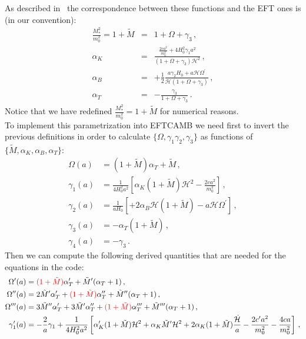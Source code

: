 \documentclass[prd,nofootinbib,showpacs]{revtex4}
\def\l{\left}
\def\r{\right}
\def\f{\frac}
\def\nn{\nonumber}
\def\hub{{\mathcal H}}
\begin{document}
{As described in~\cite{Bellini:2014fua}  the correspondence between these functions and the EFT ones is (in our convention):
 \begin{eqnarray}
\f{M_*^2}{m_0^2}=1+ \tilde{M}&=& 1+\Omega+ \gamma_3 \, , \nn \\
\alpha_K&= & \f{\f{2ca^2}{m_0^2}+4H_0^2\gamma_1a^2}{(1+\Omega+ \gamma_3)\hub^2} \, ,\nn \\
\alpha_B&=&  +\f{1}{2}\f{a\gamma_2H_0+a\hub\Omega^\prime}{\hub(1+\Omega+ \gamma_3) } \,, \nn \\
\alpha_T&=& -\f{\gamma_3}{1+\Omega+ \gamma_3} \,.
\end{eqnarray}
Notice that we have redefined $\f{M_*^2}{m_0^2}=1+ \tilde{M}$ for numerical reasons. \\
To implement this parametrization into EFTCAMB we need first to invert the previous definitions in order to calculate $\{\Omega, \gamma_1\gamma_2,\gamma_3\}$ as functions of $\{\tilde{M},\alpha_K,\alpha_B,\alpha_T\}$:
\begin{align}
\Omega(a) &= (1+ \tilde{M})\alpha_T+ \tilde{M}\,, \nonumber \\
\gamma_1(a) &= \f{1}{4H_0^2a^2}\l[\alpha_K(1+ \tilde{M})\hub^2-\f{2ca^2}{m_0^2}\r]\,,  \nonumber \\
\gamma_2(a) &=  \f{1}{aH_0}\l[+2\alpha_B\hub (1+ \tilde{M})-a\hub\Omega^\prime\r] \,,  \nonumber \\
\gamma_3(a) &= -\alpha_T(1+ \tilde{M}) \,,  \nonumber \\
\gamma_4(a) &= -\gamma_3\,.
\end{align}
%
Then we can compute the following derived quantities that are needed for the equations in the code:
\begin{align}
\Omega'(a) &=  \textcolor{red}{(1+\tilde{M})}\alpha_T^\prime+ \tilde{M}^\prime(\alpha_T+1)\,,  \nonumber \\ 
\Omega''(a) &= 2\tilde{M}^\prime \alpha_T^\prime + \textcolor{red}{(1+\tilde{M})}\alpha_T^{\prime\prime}+\tilde{M}^{\prime\prime}(\alpha_T+1)\,,  \nonumber \\
\Omega'''(a) &=   3\tilde{M}^{\prime\prime}\alpha_T^\prime+3\tilde{M}^\prime\alpha_T^{\prime\prime}+ \textcolor{red}{(1+\tilde{M})}\alpha_T^{\prime\prime\prime}+\tilde{M}^{\prime\prime\prime}(\alpha_T+1)\,,  \nonumber \\
\gamma_1'(a) &= -\f{2}{a}\gamma_1+\f{1}{4H_0^2a^2}\l[\alpha_K^\prime(1+ \tilde{M})\hub^2+\alpha_K\tilde{M}^\prime\hub^2+2\alpha_K(1+ \tilde{M})\f{\dot{\hub}}{a}-\f{2c^\prime a^2}{m_0^2}-\f{4ca}{m_0^2}\r] \,,  \nonumber \\

\end{align}}
\end{document}
